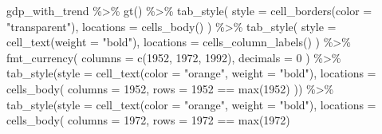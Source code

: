 \documentclass[
]{book}
\newenvironment{Shaded}{\begin{snugshade}}{\end{snugshade}}
\newcommand{\AttributeTok}[1]{\textcolor[rgb]{0.77,0.63,0.00}{#1}}
\newcommand{\DecValTok}[1]{\textcolor[rgb]{0.00,0.00,0.81}{#1}}
\newcommand{\FunctionTok}[1]{\textcolor[rgb]{0.00,0.00,0.00}{#1}}
\newcommand{\NormalTok}[1]{#1}
\newcommand{\SpecialCharTok}[1]{\textcolor[rgb]{0.00,0.00,0.00}{#1}}
\newcommand{\StringTok}[1]{\textcolor[rgb]{0.31,0.60,0.02}{#1}}
\begin{document}
\begin{Shaded}
\begin{Highlighting}[]
\NormalTok{gdp\_with\_trend }\SpecialCharTok{\%\textgreater{}\%} 
  \FunctionTok{gt}\NormalTok{() }\SpecialCharTok{\%\textgreater{}\%} 
  \FunctionTok{tab\_style}\NormalTok{(}
    \AttributeTok{style =} \FunctionTok{cell\_borders}\NormalTok{(}\AttributeTok{color =} \StringTok{"transparent"}\NormalTok{),}
    \AttributeTok{locations =} \FunctionTok{cells\_body}\NormalTok{()}
\NormalTok{  ) }\SpecialCharTok{\%\textgreater{}\%}
  \FunctionTok{tab\_style}\NormalTok{(}
    \AttributeTok{style =} \FunctionTok{cell\_text}\NormalTok{(}\AttributeTok{weight =} \StringTok{"bold"}\NormalTok{),}
    \AttributeTok{locations =} \FunctionTok{cells\_column\_labels}\NormalTok{()}
\NormalTok{  ) }\SpecialCharTok{\%\textgreater{}\%}
  \FunctionTok{fmt\_currency}\NormalTok{(}
    \AttributeTok{columns =} \FunctionTok{c}\NormalTok{(}\StringTok{\textasciigrave{}}\AttributeTok{1952}\StringTok{\textasciigrave{}}\NormalTok{, }\StringTok{\textasciigrave{}}\AttributeTok{1972}\StringTok{\textasciigrave{}}\NormalTok{, }\StringTok{\textasciigrave{}}\AttributeTok{1992}\StringTok{\textasciigrave{}}\NormalTok{),}
    \AttributeTok{decimals =} \DecValTok{0}
\NormalTok{  ) }\SpecialCharTok{\%\textgreater{}\%} 
  \FunctionTok{tab\_style}\NormalTok{(}\AttributeTok{style =} \FunctionTok{cell\_text}\NormalTok{(}\AttributeTok{color =} \StringTok{"orange"}\NormalTok{,}
                              \AttributeTok{weight =} \StringTok{"bold"}\NormalTok{),}
            \AttributeTok{locations =} \FunctionTok{cells\_body}\NormalTok{(}
              \AttributeTok{columns =} \StringTok{\textasciigrave{}}\AttributeTok{1952}\StringTok{\textasciigrave{}}\NormalTok{,}
              \AttributeTok{rows =} \StringTok{\textasciigrave{}}\AttributeTok{1952}\StringTok{\textasciigrave{}} \SpecialCharTok{==} \FunctionTok{max}\NormalTok{(}\StringTok{\textasciigrave{}}\AttributeTok{1952}\StringTok{\textasciigrave{}}\NormalTok{)}
\NormalTok{            )) }\SpecialCharTok{\%\textgreater{}\%} 
  \FunctionTok{tab\_style}\NormalTok{(}\AttributeTok{style =} \FunctionTok{cell\_text}\NormalTok{(}\AttributeTok{color =} \StringTok{"orange"}\NormalTok{,}
                              \AttributeTok{weight =} \StringTok{"bold"}\NormalTok{),}
            \AttributeTok{locations =} \FunctionTok{cells\_body}\NormalTok{(}
              \AttributeTok{columns =} \StringTok{\textasciigrave{}}\AttributeTok{1972}\StringTok{\textasciigrave{}}\NormalTok{,}
              \AttributeTok{rows =} \StringTok{\textasciigrave{}}\AttributeTok{1972}\StringTok{\textasciigrave{}} \SpecialCharTok{==} \FunctionTok{max}\NormalTok{(}\StringTok{\textasciigrave{}}\AttributeTok{1972}\StringTok{\textasciigrave{}}\NormalTok{)}

\end{Highlighting}
\end{Shaded}
\end{document}
